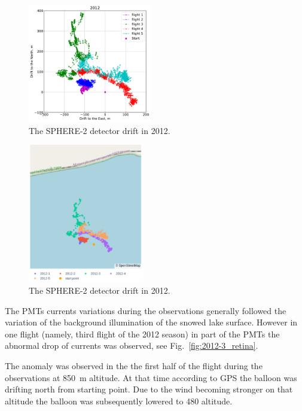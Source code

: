 \documentclass[final,5p,times,twocolumn]{elsarticle}
\begin{document}
\begin{figure}[tb]
    \includegraphics[width=0.48\textwidth]{figs/2012_drift.pdf}
    \caption{The SPHERE-2 detector drift in 2012.}
    \label{fig:2012-drift}
\end{figure}
\begin{figure}[tb]
    \includegraphics[width=0.45\textwidth]{figs/newplot2.pdf}
    \caption{The SPHERE-2 detector drift in 2012.}
\end{figure}


The PMTs currents variations during the observations generally followed the variation of the background illumination of the snowed lake surface. However in one flight (namely, third flight of the 2012 season) in part of the PMTs
the abnormal drop of currents was observed, see Fig.~\ref{fig:2012-3_retina}.

The anomaly was observed in the the first half of the flight during the observations at 850~m altitude. At that time according to GPS the balloon was drifting north from starting point. Due to the wind becoming stronger on that altitude the balloon was subsequently lowered to 480 altitude.
\end{document}
